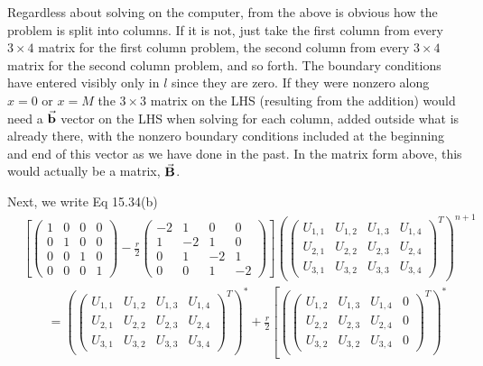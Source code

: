 \documentclass[11pt]{article}
\def\f{\frac }
\newcommand{\bvec}[1]{\vec{ {\bf #1 } }}
\begin{document}
\begin{enumerate}
Regardless about solving on the computer, from the above is obvious how the problem is split into columns.
If it is not, just take the first column from every $3\times 4$ matrix for the first column problem, the second column from every $3\times 4$ matrix for the second column problem, and so forth.
The boundary conditions have entered visibly only in $l$ since they are zero.
If they were nonzero along $x=0$ or $x=M$ the $3\times 3$ matrix on the LHS (resulting from the addition) would need a $\bvec{b}$ vector on the LHS when solving for each column, added outside what is already there, with the nonzero boundary conditions included at the beginning and end of this vector as we have done in the past.
In the matrix form above, this would actually be a matrix, $\bvec{B}$.

Next, we write Eq 15.34(b) 
\begin{align*} & \left [ \left ( \begin{array}{cccc} 1 & 0 & 0 & 0\\ 0 & 1 & 0 & 0\\ 0 & 0 & 1 & 0\\ 0 & 0 & 0 & 1\end{array} \right )  - \f{r}{2} \left ( \begin{array}{cccc} -2 & 1 & 0 & 0 \\ 1 & -2 & 1 & 0\\ 0 & 1 & -2 & 1\\ 0 & 0 & 1 & -2\end{array} \right )\right ] \left ( \left ( \begin{array}{cccc} U_{1,1} & U_{1,2} & U_{1,3} & U_{1,4 }\\ U_{2,1} & U_{2,2} & U_{2,3} & U_{2,4 } \\ U_{3,1} & U_{3,2} & U_{3,3} & U_{3,4 }  \end{array} \right ) ^T \right ) ^{n+1} \\
& ~~~~~~~~~= \left ( \left ( \begin{array}{cccc} U_{1,1} & U_{1,2} & U_{1,3} & U_{1,4 }\\ U_{2,1} & U_{2,2} & U_{2,3} & U_{2,4 } \\ U_{3,1} & U_{3,2} & U_{3,3} & U_{3,4 }  \end{array} \right )  ^T \right )  ^{*} + \f{r}{2} \left [ \left ( \left ( \begin{array}{cccc} U_{1,2} & U_{1,3} & U_{1,4} & 0 \\ U_{2,2} & U_{2,3} & U_{2,4} & 0 \\ U_{3,2} & U_{3,2} & U_{3,4} & 0  \end{array} \right ) ^T \right ) ^{*} \right.\\

\end{align*}
\end{enumerate}
\end{document}
